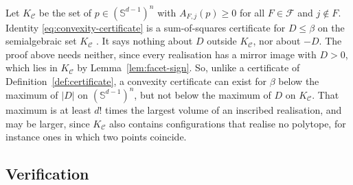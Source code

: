 \begin{remark}
  \label{rem:what-it-bounds}
  Let $K_{\mathcal{C}}$ be the set of $p \in (\mathbb{S}^{d-1})^{n}$ with
  $A_{F,j}(p) \geq 0$ for all $F \in \mathcal{F}$ and $j \notin F$.
  Identity \eqref{eq:convexity-certificate} is a sum-of-squares certificate
  for $D \leq \beta$ on the semialgebraic set $K_{\mathcal{C}}$
  \cite[Section~5]{parrilo-2003}. It says nothing about $D$ outside
  $K_{\mathcal{C}}$, nor about $-D$. The proof above needs neither, since
  every realisation has a mirror image with $D > 0$, which lies in
  $K_{\mathcal{C}}$ by Lemma~\ref{lem:facet-sign}. So, unlike a certificate
  of Definition~\ref{def:certificate}, a convexity certificate can exist for
  $\beta$ below the maximum of $|D|$ on $(\mathbb{S}^{d-1})^{n}$, but not
  below the maximum of $D$ on $K_{\mathcal{C}}$. That maximum is at least
  $d!$ times the largest volume of an inscribed realisation, and may be
  larger, since $K_{\mathcal{C}}$ also contains configurations that realise
  no polytope, for instance ones in which two points coincide.
\end{remark}

\subsection{Verification}
\label{sec:verification}

